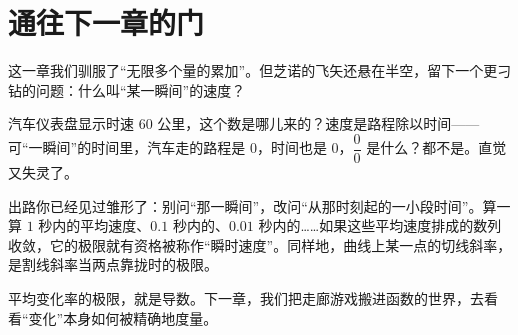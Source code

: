 \section*{通往下一章的门}

这一章我们驯服了“无限多个量的累加”。但芝诺的飞矢还悬在半空，留下一个更刁钻的问题：什么叫“某一瞬间”的速度？

汽车仪表盘显示时速 $60$ 公里，这个数是哪儿来的？速度是路程除以时间——可“一瞬间”的时间里，汽车走的路程是 $0$，时间也是 $0$，$\dfrac{0}{0}$ 是什么？都不是。直觉又失灵了。

出路你已经见过雏形了：别问“那一瞬间”，改问“从那时刻起的一小段时间”。算一算 $1$ 秒内的平均速度、$0.1$ 秒内的、$0.01$ 秒内的……如果这些平均速度排成的数列收敛，它的极限就有资格被称作“瞬时速度”。同样地，曲线上某一点的切线斜率，是割线斜率当两点靠拢时的极限。

平均变化率的极限，就是导数。下一章，我们把走廊游戏搬进函数的世界，去看看“变化”本身如何被精确地度量。
